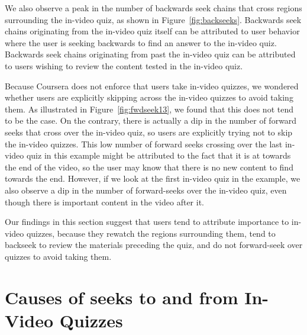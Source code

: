 \documentclass{sigchi}
\begin{document}
We also observe a peak in the number of backwards seek chains that cross regions surrounding the in-video quiz, as shown in Figure~\ref{fig:backseeks}. Backwards seek chains originating from the in-video quiz itself can be attributed to user behavior where the user is seeking backwards to find an answer to the in-video quiz. Backwards seek chains originating from past the in-video quiz can be attributed to users wishing to review the content tested in the in-video quiz.

Because Coursera does not enforce that users take in-video quizzes, we wondered whether users are explicitly skipping across the in-video quizzes to avoid taking them. As illustrated in Figure~\ref{fig:fwdseek13}, we found that this does not tend to be the case. On the contrary, there is actually a dip in the number of forward seeks that cross over the in-video quiz, so users are explicitly trying not to skip the in-video quizzes. This low number of forward seeks crossing over the last in-video quiz in this example might be attributed to the fact that it is at towards the end of the video, so the user may know that there is no new content to find towards the end. However, if we look at the first in-video quiz in the example, we also observe a dip in the number of forward-seeks over the in-video quiz, even though there is important content in the video after it.

Our findings in this section suggest that users tend to attribute importance to in-video quizzes, because they rewatch the regions surrounding them, tend to backseek to review the materials preceding the quiz, and do not forward-seek over quizzes to avoid taking them.

\section{Causes of seeks to and from In-Video Quizzes}
\end{document}
